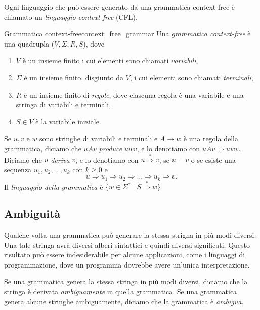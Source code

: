 \documentclass[12pt]{report}
\newcounter{definition}
\newcommand{\nmu}{}
\begin{document}
Ogni linguaggio che può essere generato da una grammatica context-free è chiamato un \textit{linguaggio context-free} (CFL).
\begin{definition}{\nmu Grammatica context-free}{context_free_grammar}
	Una \textit{grammatica context-free} è una quadrupla ($V, \Sigma, R, S$), dove
	\begin{enumerate}
		\item $V$ è un insieme finito i cui elementi sono chiamati \textit{variabili},
		\item $\Sigma$ è un insieme finito, disgiunto da $V$, i cui elementi sono chiamati \textit{terminali},
		\item $R$ è un insieme finito di \textit{regole}, dove ciascuna regola è una variabile e una stringa di variabili e terminali,
		\item $S \in V$ è la variabile iniziale.
	\end{enumerate}
\end{definition}
Se $u, v$ e $w$ sono stringhe di variabili e terminali e $A \to w$ è una regola della grammatica, diciamo che $uAv$ \textit{produce} $uwv$, e lo denotiamo con $uAv \Rightarrow uwv$. Diciamo che $u$ \textit{deriva} $v$, e lo denotiamo con $u \overset{*}{\Rightarrow} v$, se $u = v$ o se esiste una sequenza $u_1, u_2, \dots, u_k$ con $k \geq 0$ e
\[
u \Rightarrow u_1 \Rightarrow u_2 \Rightarrow \dots \Rightarrow u_k \Rightarrow v.
\]
Il \textit{linguaggio della grammatica} è $\{w \in \Sigma^* \mid S \overset{*}{\Rightarrow} w\}$

\subsection{Ambiguità}
Qualche volta una grammatica può generare la stessa strigna in più modi diversi. Una tale stringa avrà diversi alberi sintattici e quindi diversi significati. Questo risultato può essere indesiderabile per alcune applicazioni, come i linguaggi di programmazione, dove un programma dovrebbe avere un'unica interpretazione.

Se una grammatica genera la stessa stringa in più modi diversi, diciamo che la stringa è derivata \textit{ambiguamente} in quella grammatica. Se una grammatica genera alcune stringhe ambiguamente, diciamo che la grammatica è \textit{ambigua}.
\end{document}
